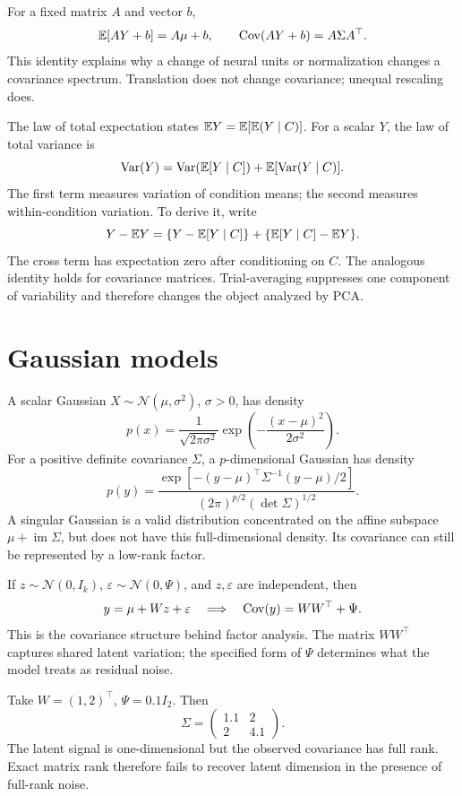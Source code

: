 For a fixed matrix \(A\) and vector \(b\),
\[
\mathbb{E}[AY+b]=A\mu+b,\qquad
\operatorname{Cov}(AY+b)=A\Sigma A^\top.
\]
This identity explains why a change of neural units or normalization changes a covariance spectrum. Translation does not change covariance; unequal rescaling does.

The law of total expectation states \(\mathbb{E} Y=\mathbb{E}[\mathbb{E}(Y\mid C)]\). For a scalar \(Y\), the law of total variance is
\begin{equation}\label{eq:c-totalvariance}
\operatorname{Var}(Y)=\operatorname{Var}(\mathbb{E}[Y\mid C])+\mathbb{E}[\operatorname{Var}(Y\mid C)].
\end{equation}
The first term measures variation of condition means; the second measures within-condition variation. To derive it, write
\[
Y-\mathbb{E} Y=\{Y-\mathbb{E}[Y\mid C]\}+\{\mathbb{E}[Y\mid C]-\mathbb{E} Y\}.
\]
The cross term has expectation zero after conditioning on \(C\). The analogous identity holds for covariance matrices. Trial-averaging suppresses one component of variability and therefore changes the object analyzed by PCA.

\section{Gaussian models}
A scalar Gaussian \(X\sim\mathcal N(\mu,\sigma^2)\), \(\sigma>0\), has density
\[
p(x)=\frac{1}{\sqrt{2\pi\sigma^2}}
\exp\!\left(-\frac{(x-\mu)^2}{2\sigma^2}\right).
\]
For a positive definite covariance \(\Sigma\), a \(p\)-dimensional Gaussian has density
\[
p(y)=\frac{\exp[-(y-\mu)^\top\Sigma^{-1}(y-\mu)/2]}
{(2\pi)^{p/2}(\det\Sigma)^{1/2}}.
\]
A singular Gaussian is a valid distribution concentrated on the affine subspace $\mu+\operatorname{im}\Sigma$, but does not have this full-dimensional density. Its covariance can still be represented by a low-rank factor.

If \(z\sim\mathcal N(0,I_k)\), \(\varepsilon\sim\mathcal N(0,\Psi)\), and \(z,\varepsilon\) are independent, then
\[
y=\mu+Wz+\varepsilon
\quad\Longrightarrow\quad
\operatorname{Cov}(y)=WW^\top+\Psi.
\]
This is the covariance structure behind factor analysis. The matrix \(WW^\top\) captures shared latent variation; the specified form of \(\Psi\) determines what the model treats as residual noise.

\begin{example}
Take \(W=(1,2)^\top\), \(\Psi=0.1I_2\). Then
\[
\Sigma=\begin{pmatrix}1.1&2\\2&4.1\end{pmatrix}.
\]
The latent signal is one-dimensional but the observed covariance has full rank. Exact matrix rank therefore fails to recover latent dimension in the presence of full-rank noise.
\end{example}

